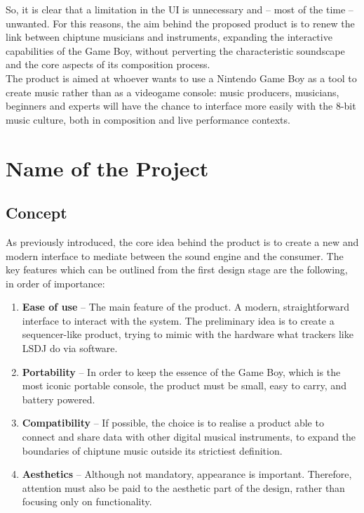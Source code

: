 \documentclass[]{article}
\begin{document}
            So, it is clear that a limitation in the UI is unnecessary and -- most of the time -- unwanted. For this reasons, the aim 
            behind the proposed product is to renew the link between chiptune musicians and instruments, expanding the interactive capabilities of the Game Boy, 
            without perverting the characteristic soundscape and the core aspects of its composition process.\\
            The product is aimed at whoever wants to use a Nintendo Game Boy as a tool to create music rather than as a videogame console: music producers,
            musicians, beginners and experts will have the chance to interface more easily with the 8-bit music culture, both in 
            composition and live performance contexts.

\section{Name of the Project}  %
    \subsection{Concept}
            As previously introduced, the core idea behind the product is to create a new and modern interface to mediate between the 
            sound engine and the consumer. The key features which can be outlined from the first design stage are the following, in order of importance:

            \begin{enumerate}
                \item \textbf{Ease of use} -- The main feature of the product. A modern, straightforward interface to interact with the system. The preliminary
                        idea is to create a sequencer-like product, trying to mimic with the hardware what trackers like LSDJ do via software.
                \item \textbf{Portability} -- In order to keep the essence of the Game Boy, which is the most iconic portable console, the product must be small, 
                        easy to carry, and battery powered.
                \item \textbf{Compatibility} -- If possible, the choice is to realise a product able to connect and share data with other digital musical instruments, 
                        to expand the boundaries of chiptune music outside its strictiest definition.
                \item \textbf{Aesthetics} -- Although not mandatory, appearance is important. Therefore, attention must also be paid 
                        to the aesthetic part of the design, rather than focusing only on functionality.
            \end{enumerate}
            
\end{document}
